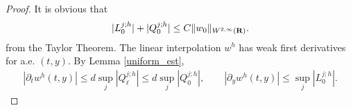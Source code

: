 \documentclass[11pt]{amsart}
\def\red{\color{red}}
\def\R{{\bf R}}
\def\R{\mathbb{R}}
\def\R{{\bf R}}
\newtheorem{lemma}{Lemma}[section]
\begin{document}
\begin{proof}
It is obvious that
$$|L_0^{j;h}| + |Q_0^{j;h}| \le C\|w_0\|_{W^{2,\infty}(\R)}.$$
from the Taylor Theorem. The linear interpolation $w^h$ has weak first 
derivatives for a.e. $(t,y)$. By Lemma \ref{uniform_est},
 \begin{align*}
 |\partial_t w^h(t,y)| \le d\sup_j |Q^{j;h}_{\ell}|\le d\sup_j |Q^{j;h}_{0}|,\quad \quad
 |\partial_y w^h(t,y)| \le \sup_j |L_0^{j;h}|.
 \end{align*}
\end{proof}
% 
\end{document}

